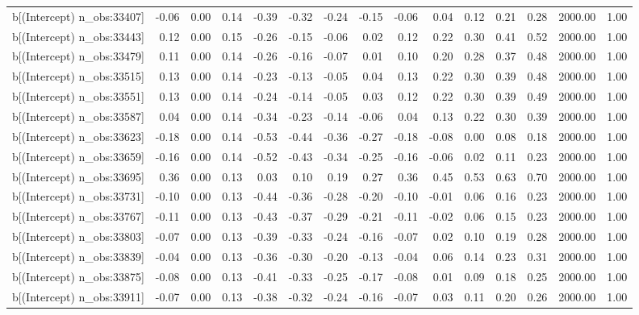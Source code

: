 \begin{table}[ht]
\begin{tabular}{rrrrrrrrrrrrrrr}
  b[(Intercept) n\_obs:33407] & -0.06 & 0.00 & 0.14 & -0.39 & -0.32 & -0.24 & -0.15 & -0.06 & 0.04 & 0.12 & 0.21 & 0.28 & 2000.00 & 1.00 \\ 
  b[(Intercept) n\_obs:33443] & 0.12 & 0.00 & 0.15 & -0.26 & -0.15 & -0.06 & 0.02 & 0.12 & 0.22 & 0.30 & 0.41 & 0.52 & 2000.00 & 1.00 \\ 
  b[(Intercept) n\_obs:33479] & 0.11 & 0.00 & 0.14 & -0.26 & -0.16 & -0.07 & 0.01 & 0.10 & 0.20 & 0.28 & 0.37 & 0.48 & 2000.00 & 1.00 \\ 
  b[(Intercept) n\_obs:33515] & 0.13 & 0.00 & 0.14 & -0.23 & -0.13 & -0.05 & 0.04 & 0.13 & 0.22 & 0.30 & 0.39 & 0.48 & 2000.00 & 1.00 \\ 
  b[(Intercept) n\_obs:33551] & 0.13 & 0.00 & 0.14 & -0.24 & -0.14 & -0.05 & 0.03 & 0.12 & 0.22 & 0.30 & 0.39 & 0.49 & 2000.00 & 1.00 \\ 
  b[(Intercept) n\_obs:33587] & 0.04 & 0.00 & 0.14 & -0.34 & -0.23 & -0.14 & -0.06 & 0.04 & 0.13 & 0.22 & 0.30 & 0.39 & 2000.00 & 1.00 \\ 
  b[(Intercept) n\_obs:33623] & -0.18 & 0.00 & 0.14 & -0.53 & -0.44 & -0.36 & -0.27 & -0.18 & -0.08 & 0.00 & 0.08 & 0.18 & 2000.00 & 1.00 \\ 
  b[(Intercept) n\_obs:33659] & -0.16 & 0.00 & 0.14 & -0.52 & -0.43 & -0.34 & -0.25 & -0.16 & -0.06 & 0.02 & 0.11 & 0.23 & 2000.00 & 1.00 \\ 
  b[(Intercept) n\_obs:33695] & 0.36 & 0.00 & 0.13 & 0.03 & 0.10 & 0.19 & 0.27 & 0.36 & 0.45 & 0.53 & 0.63 & 0.70 & 2000.00 & 1.00 \\ 
  b[(Intercept) n\_obs:33731] & -0.10 & 0.00 & 0.13 & -0.44 & -0.36 & -0.28 & -0.20 & -0.10 & -0.01 & 0.06 & 0.16 & 0.23 & 2000.00 & 1.00 \\ 
  b[(Intercept) n\_obs:33767] & -0.11 & 0.00 & 0.13 & -0.43 & -0.37 & -0.29 & -0.21 & -0.11 & -0.02 & 0.06 & 0.15 & 0.23 & 2000.00 & 1.00 \\ 
  b[(Intercept) n\_obs:33803] & -0.07 & 0.00 & 0.13 & -0.39 & -0.33 & -0.24 & -0.16 & -0.07 & 0.02 & 0.10 & 0.19 & 0.28 & 2000.00 & 1.00 \\ 
  b[(Intercept) n\_obs:33839] & -0.04 & 0.00 & 0.13 & -0.36 & -0.30 & -0.20 & -0.13 & -0.04 & 0.06 & 0.14 & 0.23 & 0.31 & 2000.00 & 1.00 \\ 
  b[(Intercept) n\_obs:33875] & -0.08 & 0.00 & 0.13 & -0.41 & -0.33 & -0.25 & -0.17 & -0.08 & 0.01 & 0.09 & 0.18 & 0.25 & 2000.00 & 1.00 \\ 
  b[(Intercept) n\_obs:33911] & -0.07 & 0.00 & 0.13 & -0.38 & -0.32 & -0.24 & -0.16 & -0.07 & 0.03 & 0.11 & 0.20 & 0.26 & 2000.00 & 1.00 \\ 

\end{tabular}
\end{table}
